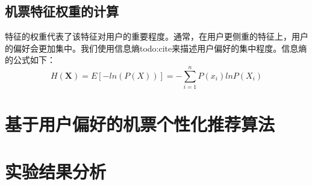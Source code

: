 \subsection{机票特征权重的计算}

特征的权重代表了该特征对用户的重要程度。通常，在用户更侧重的特征上，用户的偏好会更加集中。我们使用信息熵todo:cite来描述用户偏好的集中程度。信息熵的公式如下：
\begin{equation}
\label{eq:entropy}
	H(\mathbf{X}) = E[-ln(P(X))] = - \sum_{i=1}^n P(x_i)lnP(X_i)
\end{equation}\par


\section{基于用户偏好的机票个性化推荐算法}

\section{实验结果分析}